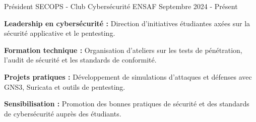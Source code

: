 
\begin{cventries}

    \cventry
    {Président} %
    {SECOPS - Club Cybersécurité} %
    {ENSAF} %
    {Septembre 2024 - Présent} %
    {
        \begin{cvitems} %
            \item {\textbf{Leadership en cybersécurité :} Direction d'initiatives étudiantes axées sur la sécurité applicative et le pentesting.}
            \item {\textbf{Formation technique :} Organisation d'ateliers sur les tests de pénétration, l'audit de sécurité et les standards de conformité.}
            \item {\textbf{Projets pratiques :} Développement de simulations d'attaques et défenses avec GNS3, Suricata et outils de pentesting.}
            \item {\textbf{Sensibilisation :} Promotion des bonnes pratiques de sécurité et des standards de cybersécurité auprès des étudiants.}
        \end{cvitems}
    }

\end{cventries}